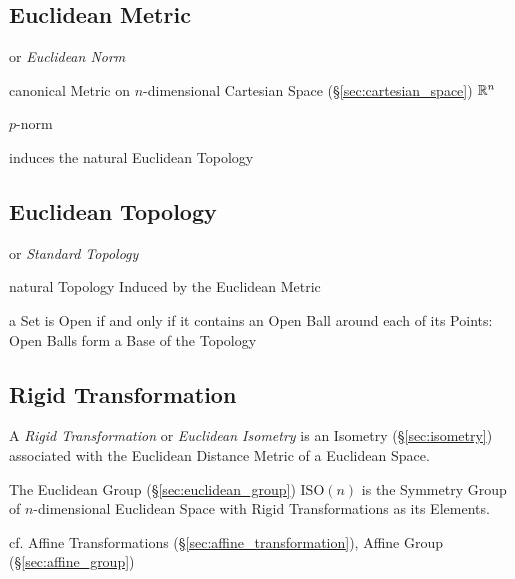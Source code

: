 \subsection{Euclidean Metric}\label{sec:euclidean_metric}

or \emph{Euclidean Norm}

canonical Metric on $n$-dimensional Cartesian Space
(\S\ref{sec:cartesian_space}) $\mathbb{R}^n$

$p$-norm

induces the natural Euclidean Topology



\subsection{Euclidean Topology}\label{sec:euclidean_topology}

or \emph{Standard Topology}

natural Topology Induced by the Euclidean Metric

a Set is Open if and only if it contains an Open Ball around each of its Points:
Open Balls form a Base of the Topology



\subsection{Rigid Transformation}\label{sec:rigid_transformation}

A \emph{Rigid Transformation} or \emph{Euclidean Isometry} is an Isometry
(\S\ref{sec:isometry}) associated with the Euclidean Distance Metric of a
Euclidean Space.

The Euclidean Group (\S\ref{sec:euclidean_group}) $\mathrm{ISO}(n)$ is the
Symmetry Group of $n$-dimensional Euclidean Space with Rigid Transformations as
its Elements.

cf. Affine Transformations (\S\ref{sec:affine_transformation}), Affine Group
(\S\ref{sec:affine_group})



